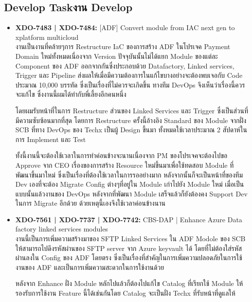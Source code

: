 \subsection{\ifenglish Develop Task\else งาน Develop\fi}
\begin{itemize}
      \item \textbf{XDO-7483 | XDO-7484:} [ADF] Convert module from IAC next gen to xplatform multicloud\\
            งานเป็นงานที่คล้ายๆการ Restructure IaC ของการสร้าง ADF ในโปรเจค Payment Domain ใหม่ทั้งหมดเนื่องจาก Version ปัจจุบันนั้นไม่ได้แยก Module ของแต่ละ Component ของ ADF ออกจากกันซึ่งประกอบด้วย Datafactory, Linked services, Trigger และ Pipeline ส่งผลให้เมื่อมีความต้องการในแก้ไขบางอย่างจะต้องพบเจอกับ Code ประมาณ 10,000 บรรทัด ซึ่งเป็นเรื่องที่ไม่ควรจะเกิดขึ้น ทางทีม DevOps จึงเห็นว่าเรื่องนี้ควรจะแก้ไข ซึ่งงานนี้ผมได้ทำกับพี่เลี้ยงอีกคนหนึ่ง 
            
            โดยผมรับหน้าที่ในการ Restructure ส่วนของ Linked Services และ Trigger ซึ่งเป็นส่วนที่มีความซับซ้อนมากที่สุด โดยการ Restructure ครั้งนี้อ้างอิง Standard ของ Module จากฝั่ง SCB ที่ทาง DevOps ของ Techx เป็นผู้ Design ขึ้นมา ทั้งหมดใช้เวลาประมาณ 2 สัปดาห์ในการ Implement และ Test

            ทั้งนี้งานนี้จะต้องใช้เวลาในการทำค่อนข้างจะนานเนื่องจาก PM ของโปรเจคจะต้องไปขอ Approve จาก CEO เรื่องของการสร้าง Resource ใหม่ขึ้นมาเพื่อใช้ทดสอบ Module ที่พัฒนาขึ้นมาใหม่ ซึ่งเป็นเรื่องที่ต้องใช้เวลาในการรออย่างมาก หลังจากนั้นก็จะเป็นหน้าที่ของทีม Dev เองที่จะต้อง Migrate Config ต่างๆที่อยู่ใน Module เก่าไปยัง Module ใหม่ เมื่อเป็นแบบนั้นแล้วงานของ DevOps หลังจากที่พัฒนา Module เสร็จแล้วก็ยังต้องคง Support Dev ในการ Migrate อีกด้วย ด้วยเหตุนี้เองจึงใช้เวลาค่อนข้างนาน
      \item \textbf{XDO-7561 | XDO-7737 | XDO-7742:} CBS-DAP | Enhance Azure Data factory linked services modules\\
            งานนี้เป็นการเพิ่มความสร้างมาของ SFTP Linked Services ใน ADF Modole ของ SCB ให้สามารถไปดึงรหัสผ่านของ SFTP server จาก Azure keyvault ได้ โดยที่ไม่ต้องใส่รหัสผ่านลงใน Config ของ ADF โดยตรง ซึ่งเป็นเรื่องที่สำคัญในการเพิ่มความปลอดภัยในการใช้งานของ ADF และเป็นการเพิ่มความสะดวกในการใช้งานด้วย

            หลังจาก Enhance ฝั่ง Module หลักไปแล้วก็ต้องไปแก้ไข Catalog ที่เรียกใช้ Module ให้รองรับการใช้งาน Feature นี้ได้เช่นกันโดย Catalog จะเป็นฝั่ง Techx ที่รับหน้าที่ดูแลให้


\end{itemize}

